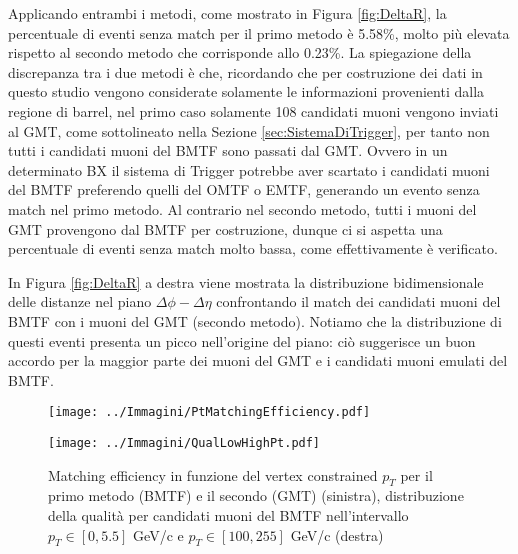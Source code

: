 Applicando entrambi i metodi, come mostrato in Figura \ref{fig:DeltaR}, la percentuale di eventi senza match per il primo metodo è 5.58\%, molto più elevata rispetto al secondo metodo che corrisponde allo 0.23\%. La spiegazione della discrepanza tra i due metodi è che, ricordando che per costruzione dei dati in questo studio vengono considerate solamente le informazioni provenienti dalla regione di barrel, nel primo caso solamente 108 candidati muoni vengono inviati al GMT, come sottolineato nella Sezione \ref{sec:SistemaDiTrigger}, per tanto non tutti i candidati muoni del BMTF sono passati dal GMT. Ovvero in un determinato BX il sistema di Trigger potrebbe aver scartato i candidati muoni del BMTF preferendo quelli del OMTF o EMTF, generando un evento senza match nel primo metodo. \newline
Al contrario nel secondo metodo, tutti i muoni del GMT provengono dal BMTF per costruzione, dunque ci si aspetta una percentuale di eventi senza match molto bassa, come effettivamente è verificato.

In Figura \ref{fig:DeltaR} a destra viene mostrata la distribuzione bidimensionale delle distanze nel piano $\Delta \phi - \Delta \eta$ confrontando il match dei candidati muoni del BMTF con i muoni del GMT (secondo metodo). Notiamo che la distribuzione di questi eventi presenta un picco nell'origine del piano: ciò suggerisce un buon accordo per la maggior parte dei muoni del GMT e i candidati muoni emulati del BMTF.



\begin{figure}[t]
  \centering
  \begin{minipage}[b]{0.48\textwidth}
    \centering
    \texttt{[image: ../Immagini/PtMatchingEfficiency.pdf]} 
    \end{minipage}
    \hfill 
    \begin{minipage}[b]{0.45\textwidth}
      \centering
      \texttt{[image: ../Immagini/QualLowHighPt.pdf]} 
    \end{minipage}
    \caption{Matching efficiency in funzione del vertex constrained $p_T$ per il primo metodo (BMTF) e il secondo (GMT) (sinistra), distribuzione della qualità per candidati muoni del BMTF nell'intervallo $p_T \in [0, 5.5]$ GeV/c e $p_T \in [100, 255]$ GeV/c (destra)}
  \label{fig:MatchingEfficiecyLowPt}
\end{figure}





